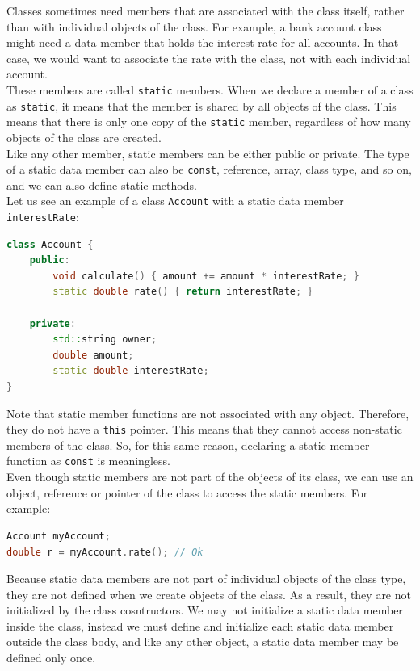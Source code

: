 Classes sometimes need members that are associated with the class itself, rather than with individual
objects of the class. For example, a bank account class might need a data member that holds the interest
rate for all accounts. In that case, we would want to associate the rate with the class, not with each 
individual account.\\

These members are called \texttt{static} members. When we declare a member of a class as \texttt{static},
it means that the member is shared by all objects of the class. This means that there is only one copy
of the \texttt{static} member, regardless of how many objects of the class are created.\\

Like any other member, static members can be either public or private. The type of a static data member
can also be \texttt{const}, reference, array, class type, and so on, and we can also define static methods.\\

Let us see an example of a class \texttt{Account} with a static data member \texttt{interestRate}:\\

\begin{lstlisting}[language=C++]
class Account {
    public:
        void calculate() { amount += amount * interestRate; }
        static double rate() { return interestRate; }
        
    private:
        std::string owner;
        double amount;
        static double interestRate;
}
\end{lstlisting}

Note that static member functions are not associated with any object. Therefore, they do not have a
\texttt{this} pointer. This means that they cannot access non-static members of the class. So, for 
this same reason, declaring a static member function as \texttt{const} is meaningless.\\

Even though static members are not part of the objects of its class, we can use an object, reference or pointer
of the class to access the static members. For example:\\

\begin{lstlisting}[language=C++]
Account myAccount;
double r = myAccount.rate(); // Ok
\end{lstlisting}

Because static data members are not part of individual objects of the class type, they are not defined
when we create objects of the class. As a result, they are not initialized by the class cosntructors.
We may not initialize a static data member inside the class, instead we must define and initialize each
static data member outside the class body, and like any other object, a static data member may be 
defined only once.\\

